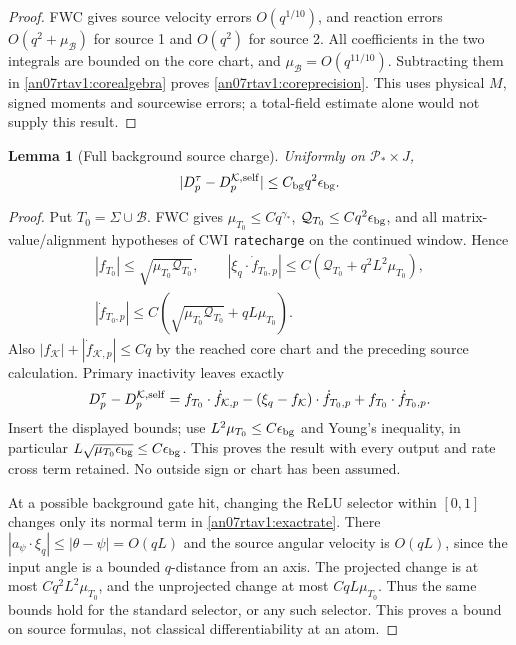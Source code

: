 \documentclass[11pt]{article}
\numberwithin{equation}{section}
\newtheorem{lemma}[theorem]{Lemma}
\newcommand{\KK}{\mathcal K}\newcommand{\BB}{\mathcal B}
\begin{document}
\begin{proof}
FWC gives source velocity errors \(O(q^{1/10})\), and reaction
errors \(O(q^2+\mu_\BB)\) for source 1 and \(O(q^2)\) for source 2.
All coefficients in the two integrals are bounded on the core
chart, and \(\mu_\BB=O(q^{11/10})\). Subtracting them in
\eqref{an07rtav1:corealgebra} proves \eqref{an07rtav1:coreprecision}.
This uses physical \(M\), signed moments and sourcewise errors;
a total-field estimate alone would not supply this result.
\end{proof}

\begin{lemma}[Full background source charge]
\label{an07rtav1:backgroundrate}
Uniformly on \(\mathcal P_*\times J\),
\begin{equation}
 |D_p^\tau-D_p^{\KK,\rm self}|
                       \le C_{\rm bg}q^2\epsilon_{\rm bg}.
 \label{an07rtav1:backgroundprecision}
\end{equation}
\end{lemma}
\begin{proof}
Put \(T_0=\Sigma\cup\BB\). FWC gives
\(\mu_{T_0}\le Cq^{\gamma_*}\),
\(\mathcal Q_{T_0}\le Cq^2\epsilon_{\rm bg}\), and all
matrix-value/alignment hypotheses of CWI \texttt{ratecharge}
on the continued window. Hence
\begin{gather*}
 |f_{T_0}|\le\sqrt{\mu_{T_0}\mathcal Q_{T_0}},\qquad
 |\xi_q\cdot\dot f_{T_0,p}|\le
                  C(\mathcal Q_{T_0}+q^2L^2\mu_{T_0}),\\
 |\dot f_{T_0,p}|\le
                  C(\sqrt{\mu_{T_0}\mathcal Q_{T_0}}+qL\mu_{T_0}).
\end{gather*}
Also \(|f_\KK|+|\dot f_{\KK,p}|\le Cq\) by the reached
core chart and the preceding source calculation.
Primary inactivity leaves exactly
\[
 D_p^\tau-D_p^{\KK,\rm self}
 =f_{T_0}\cdot\dot f_{\KK,p}
   -(\xi_q-f_\KK)\cdot\dot f_{T_0,p}
   +f_{T_0}\cdot\dot f_{T_0,p}.
\]
Insert the displayed bounds; use
\(L^2\mu_{T_0}\le C\epsilon_{\rm bg}\) and Young's inequality,
in particular \(L\sqrt{\mu_{T_0}\epsilon_{\rm bg}}
\le C\epsilon_{\rm bg}\). This proves the result with every
output and rate cross term retained. No outside sign or chart
has been assumed.

At a possible background gate hit, changing the ReLU selector
within \([0,1]\) changes only its normal term in
\eqref{an07rtav1:exactrate}. There
\(|a_\psi\cdot\xi_q|\le|\theta-\psi|=O(qL)\) and the
source angular velocity is \(O(qL)\), since the input angle
is a bounded \(q\)-distance from an axis. The projected change
is at most \(Cq^2L^2\mu_{T_0}\), and the unprojected change
at most \(CqL\mu_{T_0}\). Thus the same bounds hold for the
standard selector, or any such selector. This proves a bound
on source formulas, not classical differentiability at an atom.
\end{proof}
\end{document}
